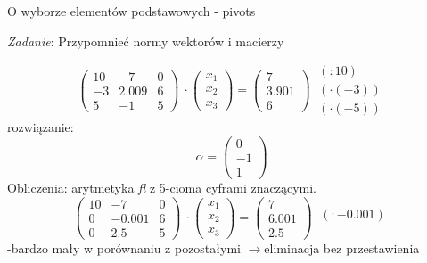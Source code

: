 \begin{frame}{ O wyborze elementów podstawowych - pivots}
\begin{flushright}
{\it Zadanie}: Przypomnieć normy wektorów $\mathrm{i}$ macierzy
\end{flushright}
$$
\left(\begin{array}{lll}
10 & -7 & 0\\
-3 & 2.009 & 6\\
5 & -1 & 5
\end{array}\right)\ \cdot
\left(\begin{array}{l}
x_{1}\\
x_{2}\\
x_{3}
\end{array}\right)=\left(\begin{array}{l}
7\\
3.901\\
6
\end{array}\right)\ 
\begin{array}{l}
(:10)\\
(\cdot(-3))\\
(\cdot(-5))
\end{array}
$$
rozwiązanie:
$$
\alpha=\left(\begin{array}{l}
0\\
-1\\
1
\end{array}\right)
$$
Obliczenia: arytmetyka {\it fl} z 5-cioma cyframi znaczącymi.
$$
\left(\begin{array}{lll}
10 & -7 & 0\\
0 & -0.001 & 6\\
0 & 2.5 & 5
\end{array}\right)\ \cdot
\left(\begin{array}{l}
x_{1}\\
x_{2}\\
x_{3}
\end{array}\right)=\left(\begin{array}{l}
7\\
6.001\\
2.5
\end{array}\right)\ 
\begin{array}{l}
\\
(:-0.001)
\\
\\
\end{array}
$$
 -bardzo mały w porównaniu z pozostałymi $\rightarrow$eliminacja bez przestawienia

\end{frame}
